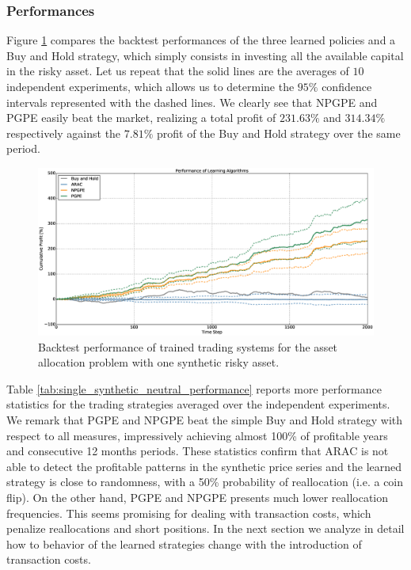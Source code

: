 \subsubsection{Performances}
Figure \ref{fig:single_synthetic_neutral_performance} compares the backtest performances of the three learned policies and a Buy and Hold strategy, which simply consists in investing all the available capital in the risky asset. Let us repeat that the solid lines are the averages of $10$ independent experiments, which allows us to determine the $95\%$ confidence intervals represented with the dashed lines. We clearly see that \gls{NPGPE} and \gls{PGPE} easily beat the market, realizing a total profit of $231.63\%$ and $314.34\%$ respectively against the $7.81\%$ profit of the Buy and Hold strategy over the same period.
\begin{figure}[t]
	\centering
	\includegraphics[width=1.0\textwidth]{Images/6_1_single_synthetic_neutral_performance}
	\caption[Backtest performance with one synthetic risky asset]{Backtest performance of trained trading systems for the asset allocation problem with one synthetic risky asset.}
	\label{fig:single_synthetic_neutral_performance}
\end{figure}
Table \ref{tab:single_synthetic_neutral_performance} reports more performance statistics for the trading strategies averaged over the independent experiments. We remark that \gls{PGPE} and \gls{NPGPE} beat the simple Buy and Hold strategy with respect to all measures, impressively achieving almost 100\% of profitable years and consecutive 12 months periods. These statistics confirm that \gls{ARAC} is not able to detect the profitable patterns in the synthetic price series and the learned strategy is close to randomness, with a 50\% probability of reallocation (i.e. a coin flip). On the other hand, \gls{PGPE} and \gls{NPGPE} presents much lower reallocation frequencies. This seems promising for dealing with transaction costs, which penalize reallocations and short positions. In the next section we analyze in detail how to behavior of the learned strategies change with the introduction of transaction costs. 


